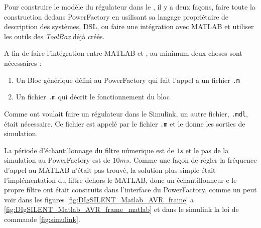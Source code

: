 Pour construire le modèle du régulateur dans le \powerfactory, il y a deux façons, faire toute la construction dedans PowerFactory en usilisant sa langage propriétaire de description des systèmes, \gls{DSL},  ou faire une intégration avec MATLAB et utiliser les outils des \textit{ToolBox} déjà créés.

A fin de faire l'intégration entre MATLAB et \powerfactory, au minimum deux choses sont nécessaires :
\begin{enumerate}
	\item Un Bloc générique défini au PowerFactory qui fait l'appel a un fichier \verb|.m|
	\item Un fichier \verb|.m| qui décrit le fonctionnement du bloc
	
\end{enumerate}

Comme ont voulait faire un régulateur dans le Simulink, un autre fichier, \verb|.mdl|, était nécessaire. Ce fichier est appelé par le fichier \verb|.m| et le donne les sorties de simulation.

La période d'échantillonnage du filtre númerique est de $ 1s $ et le pas de la simulation au PowerFactory est de $ 10ms $. Comme une façon de régler la fréquence d'appel au MATLAB n'était pas trouvé, la solution plus simple était l'implémentation du filtre dehors le MATLAB, donc un échantillonneur e le propre filtre ont était construits dans l'interface du PowerFactory, comme un peut voir dans les figures \ref{fig:DIgSILENT_Matlab_AVR_frame} a \ref{fig:DIgSILENT_Matlab_AVR_frame_matlab} et dans le simulink la loi de commande \ref{fig:simulink}.

